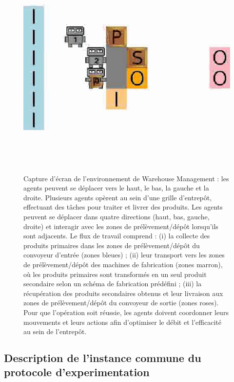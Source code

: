 \begin{figure}[h!]
  \centering
  \includegraphics[trim=0cm 3cm 0cm 3cm, clip, width=0.9\linewidth]{figures/wm.png}
  \caption[Capture d'écran de l'environnement de Warehouse Management]{Capture d'écran de l'environnement de Warehouse Management : les agents peuvent se déplacer vers le haut, le bas, la gauche et la droite. Plusieurs agents opèrent au sein d'une grille d'entrepôt, effectuant des tâches pour traiter et livrer des produits. Les agents peuvent se déplacer dans quatre directions (haut, bas, gauche, droite) et interagir avec les zones de prélèvement/dépôt lorsqu'ils sont adjacents. Le flux de travail comprend : (i) la collecte des produits primaires dans les zones de prélèvement/dépôt du convoyeur d'entrée (zones bleues) ; (ii) leur transport vers les zones de prélèvement/dépôt des machines de fabrication (zones marron), où les produits primaires sont transformés en un seul produit secondaire selon un schéma de fabrication prédéfini ; (iii) la récupération des produits secondaires obtenus et leur livraison aux zones de prélèvement/dépôt du convoyeur de sortie (zones roses). Pour que l'opération soit réussie, les agents doivent coordonner leurs mouvements et leurs actions afin d'optimiser le débit et l'efficacité au sein de l'entrepôt.}
  \label{fig:warehouse}
\end{figure}


\subsection{Description de l'instance commune du protocole d'experimentation}

